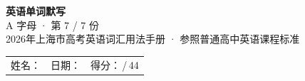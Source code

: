 \documentclass[10pt,a4paper]{article}
\begin{document}
\pagestyle{plain}

\begin{center}
{\LARGE\bfseries 英语单词默写}\\[0.22em]
{\large A 字母 · 第 7 / 7 份}\\[0.18em]
{\small 2026年上海市高考英语词汇用法手册 · 参照普通高中英语课程标准}
\end{center}

\vspace{0.25em}
\noindent\begin{tabular}{@{}p{}@{}p{}@{}p{}@{}}
姓名：\underline{\hspace{2.0cm}} & 日期：\underline{\hspace{2.0cm}} & 得分：\underline{\hspace{1.3cm}}\,/\,44 \\
\end{tabular}

\vspace{0.3em}

\vspace{0.08em}
\end{document}
